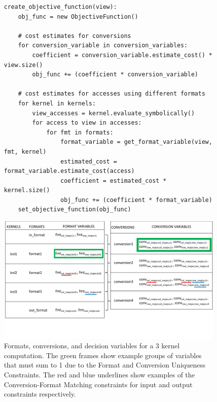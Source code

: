 \documentclass[sigconf,review=true]{acmart}
\begin{document}
\begin{figure}
\begin{lstlisting}[caption={Algorithm for constructing objective function.}, label={AlgObjFunc}]
create_objective_function(view):
	obj_func = new ObjectiveFunction()
	
	# cost estimates for conversions
	for conversion_variable in conversion_variables:
		coefficient = conversion_variable.estimate_cost() * view.size()
		obj_func += (coefficient * conversion_variable)
	
	# cost estimates for accesses using different formats
	for kernel in kernels:
		view_accesses = kernel.evaluate_symbolically()
		for access to view in accesses:
			for fmt in formats:
				format_variable = get_format_variable(view, fmt, kernel)
				estimated_cost = format_variable.estimate_cost(access)
				coefficient = estimated_cost * kernel.size()
				obj_func += (coefficient * format_variable)
	set_objective_function(obj_func)
\end{lstlisting}
\end{figure}

\begin{figure}
	\includegraphics[width=2\columnwidth]{FormatConversionFigure.pdf}
	\caption{Formats, conversions, and decision variables for a 3 kernel computation. The green frames show example groups of variables that must sum to 1 due to the Format and Conversion Uniqueness Constraints. The red and blue underlines show examples of the Conversion-Format Matching constraints for input and output constraints respectively. }
	\label{ConstraintExample}
\end{figure}
\end{document}
